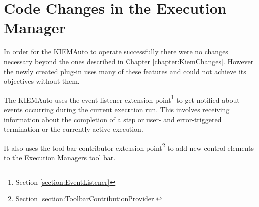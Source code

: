 \chapter{Code Changes in the Execution Manager}
\label{chapter:AutoKiemChanges}
In order for the \ac{KIEMAuto} to operate successfully there were
no changes necessary beyond the ones described in Chapter \ref{chapter:KiemChanges}. However the 
newly created plug-in uses many of these features and could not achieve its objectives without them.

The \ac{KIEMAuto} uses the event listener extension point\footnote{Section \ref{section:EventListener}} 
to get notified about events occurring during the current execution run. This involves receiving information
about the completion of a step or user- and error-triggered termination or the currently active execution.

It also uses the tool bar contributor extension point\footnote{Section \ref{section:ToolbarContributionProvider}}
to add new control elements to the Execution Managers tool bar.
